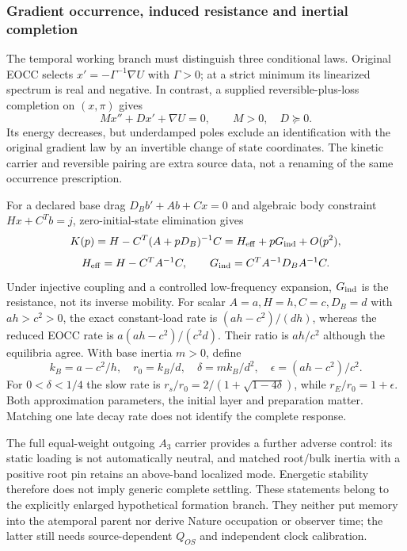\documentclass[11pt]{article}
\begin{document}
\subsubsection{Gradient occurrence, induced resistance and inertial completion}
The temporal working branch must distinguish three conditional laws. Original
EOCC selects $x'=-\Gamma^{-1}\nabla U$ with $\Gamma>0$; at a strict minimum
its linearized spectrum is real and negative. In contrast, a supplied
reversible-plus-loss completion on $(x,\pi)$ gives
\[
 Mx''+Dx'+\nabla U=0,\qquad M>0,\quad D\succeq0.
\]
Its energy decreases, but underdamped poles exclude an identification with
the original gradient law by an invertible change of state coordinates.
The kinetic carrier and reversible pairing are extra source data, not a
renaming of the same occurrence prescription.

For a declared base drag $D_Bb'+Ab+Cx=0$ and algebraic body constraint
$Hx+C^Tb=j$, zero-initial-state elimination gives
\[
 K(p)=H-C^T(A+pD_B)^{-1}C
 =H_{\rm eff}+pG_{\rm ind}+O(p^2),
\]
\[
 H_{\rm eff}=H-C^TA^{-1}C,\qquad
 G_{\rm ind}=C^TA^{-1}D_BA^{-1}C.
\]
Under injective coupling and a controlled low-frequency expansion,
$G_{\rm ind}$ is the resistance, not its inverse mobility. For scalar
$A=a,H=h,C=c,D_B=d$ with $ah>c^2>0$, the exact constant-load rate is
$(ah-c^2)/(dh)$, whereas the reduced EOCC rate is
$a(ah-c^2)/(c^2d)$. Their ratio is $ah/c^2$ although the equilibria agree.
With base inertia $m>0$, define
\[
 k_B=a-c^2/h,\quad r_0=k_B/d,\quad
 \delta=mk_B/d^2,\quad \epsilon=(ah-c^2)/c^2.
\]
For $0<\delta<1/4$ the slow rate is
$r_s/r_0=2/(1+\sqrt{1-4\delta})$, while $r_E/r_0=1+\epsilon$.
Both approximation parameters, the initial layer and preparation matter.
Matching one late decay rate does not identify the complete response.

The full equal-weight outgoing $A_3$ carrier provides a further adverse
control: its static loading is not automatically neutral, and matched
root/bulk inertia with a positive root pin retains an above-band localized
mode. Energetic stability therefore does not imply generic complete settling.
These statements belong to the explicitly enlarged hypothetical formation
branch. They neither put memory into the atemporal parent nor derive Nature
occupation or observer time; the latter still needs source-dependent
$Q_{OS}$ and independent clock calibration.
\end{document}
